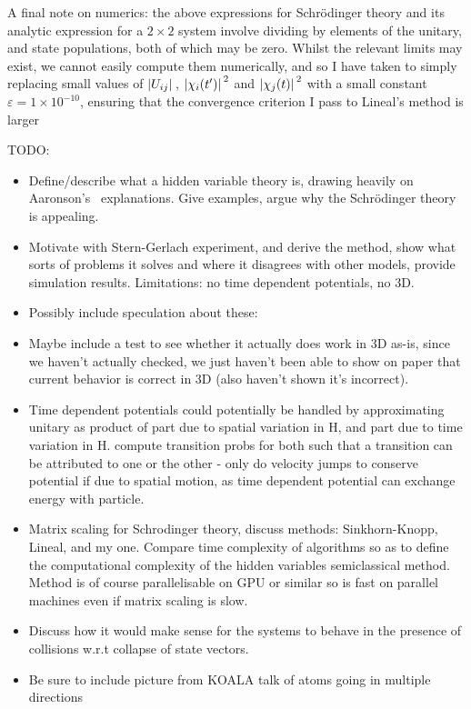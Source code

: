A final note on numerics: the above expressions for Schr\"odinger theory and its analytic expression for a $2\times2$ system involve dividing by elements of the unitary, and state populations, both of which may be zero. Whilst the relevant limits may exist, we cannot easily compute them numerically, and so I have taken to simply replacing small values of $\abs{U_{ij}}$, $\abs{\chi_i(t^\prime)}^2$ and $\abs{\chi_j(t)}^2$ with a small constant  $\varepsilon=1\times 10^{-10}$, ensuring that the convergence criterion I pass to Lineal's method is larger 
 
TODO:
\begin{itemize}
\item Define/describe what a hidden variable theory is, drawing heavily on Aaronson's~\cite{Aaronson2005} explanations. Give examples, argue why the Schr\"odinger theory is appealing.

\item Motivate with Stern-Gerlach experiment, and derive the method, show what sorts of problems it
solves and where it disagrees with other models, provide simulation results. Limitations: no time dependent potentials, no 3D.

\item Possibly include speculation about these:

\item Maybe include a test to see whether it actually does work in 3D as-is, since we haven't actually checked, we just haven't been able to show on paper that current behavior is correct in 3D (also haven't shown it's incorrect).

\item Time dependent potentials could potentially be handled by approximating unitary as product of part due to spatial variation in H, and part due to time variation in H. compute transition probs for both such that a transition can be attributed to one or the other - only do velocity jumps to conserve potential if due to spatial motion, as time dependent potential can exchange energy with particle.

\item Matrix scaling for Schrodinger theory, discuss methods: Sinkhorn-Knopp, Lineal, and my one. Compare time complexity of algorithms so as to define the computational complexity of the hidden variables semiclassical method. Method is of course parallelisable on GPU or similar so is fast on parallel machines even if matrix scaling is slow.

\item Discuss how it would make sense for the systems to behave in the presence of collisions w.r.t collapse of state vectors.

\item Be sure to include picture from KOALA talk of atoms going in multiple directions
\end{itemize}

